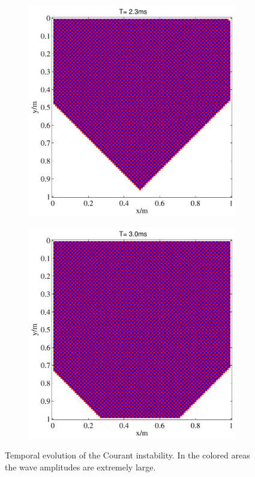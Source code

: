 \begin{figure}[ht!]
\begin{subfigure}[b]{0.45\textwidth}
        \caption{}
    \end{subfigure}
    \vfill
    \begin{subfigure}[b]{0.45\textwidth}
        \centering
        \includegraphics[width=\textwidth]{figures/courandt_3.pdf}
        \caption{}
    \end{subfigure}
    \hfill
    \begin{subfigure}[b]{0.45\textwidth}
        \centering
        \includegraphics[width=\textwidth]{figures/courandt_4.pdf}
        \caption{}
    \end{subfigure}
    \caption{\label{courant_pics} Temporal evolution of the Courant instability. In the colored areas the wave amplitudes are extremely large.}
\label{fig_courant}
\end{figure}

